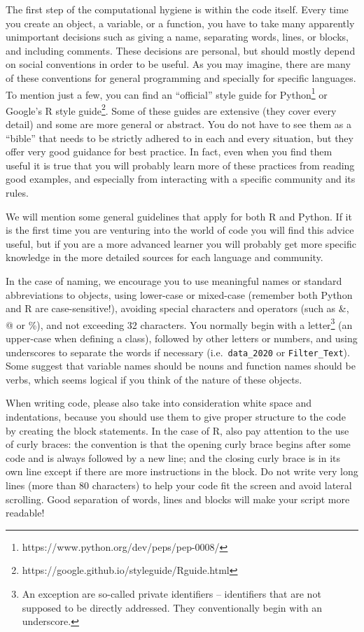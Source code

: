 The first step of the computational hygiene is within the code itself. Every time you create an object, a variable, or a function, you have to take many apparently unimportant decisions such as giving a name, separating words, lines, or blocks, and including comments. These decisions are personal, but should mostly depend on social conventions in order to be useful. As you may imagine, there are many of these conventions for general programming and specially for specific languages. To mention just a few, you can find an ``official'' style guide for Python\footnote{https://www.python.org/dev/peps/pep-0008/}  or Google's R style guide\footnote{https://google.github.io/styleguide/Rguide.html}. Some of these guides are extensive (they cover every detail) and some are more general or abstract. You do not have to see them as a ``bible'' that needs to be strictly adhered to in each and every situation, but they offer very good guidance for best practice. In fact, even when you find them useful it is true that you will probably learn more of these practices from reading good examples, and especially from interacting with a specific community and its rules.

We will mention some general guidelines that apply for both R and Python. If it is the first time you are venturing into the world of code you will find this advice useful,  but if you are a more advanced learner you will probably get more specific knowledge in the more detailed sources for each language and community.

In the case of naming, we encourage you to use meaningful names or standard abbreviations to objects, using lower-case or mixed-case (remember both Python and R are case-sensitive!), avoiding special characters and operators (such as \&, @ or \%), and not exceeding 32 characters. You normally begin with a letter\footnote{An exception are so-called private identifiers -- identifiers that are not supposed to be directly addressed. They conventionally begin with an underscore.} (an upper-case when defining a class), followed by other letters or numbers, and using underscores to separate the words if  necessary (i.e.\ \texttt{data\_2020} or \texttt{Filter\_Text}). Some suggest that variable names should be nouns and function names should be verbs, which seems logical if you think of the nature of these objects.

When writing code, please also take into consideration white space and indentations, because you should use them to give proper structure to the code by creating the block statements. In the case of R, also pay attention to the use of curly braces: the convention is that the opening curly brace begins after some code and is always followed by a new line; and the closing curly brace is in its own line except if there are more instructions in the block. Do not write very long lines (more than 80 characters) to help your code fit the screen and avoid lateral scrolling. Good separation of words, lines and blocks will make your script more readable!

